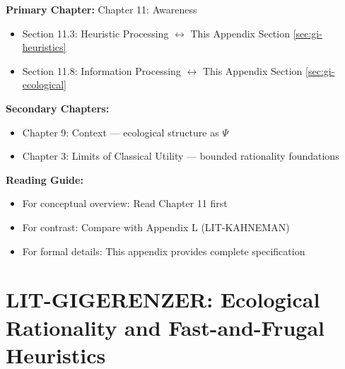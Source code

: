 \begin{tcolorbox}[colback=purple!5!white, colframe=purple!75!black,
    title=Chapter Linkage]

\textbf{Primary Chapter:} Chapter 11: Awareness
\begin{itemize}[nosep]
\item Section 11.3: Heuristic Processing $\leftrightarrow$ This Appendix Section \ref{sec:gi-heuristics}
\item Section 11.8: Information Processing $\leftrightarrow$ This Appendix Section \ref{sec:gi-ecological}
\end{itemize}

\textbf{Secondary Chapters:}
\begin{itemize}[nosep]
\item Chapter 9: Context --- ecological structure as $\Psi$
\item Chapter 3: Limits of Classical Utility --- bounded rationality foundations
\end{itemize}

\textbf{Reading Guide:}
\begin{itemize}[nosep]
\item For conceptual overview: Read Chapter 11 first
\item For contrast: Compare with Appendix L (LIT-KAHNEMAN)
\item For formal details: This appendix provides complete specification
\end{itemize}

\end{tcolorbox}


\chapter{LIT-GIGERENZER: Ecological Rationality and Fast-and-Frugal Heuristics}
\label{app:lit-gigerenzer}


\begin{abstract}
This appendix integrates Gerd Gigerenzer's research program into the EBF framework.
Gigerenzer's work establishes that: (1) simple heuristics can outperform complex
optimization in uncertain environments (less-is-more); (2) rationality should be
evaluated by fit between decision strategy and environment structure (ecological
rationality); (3) risk communication improves with natural frequencies over
probabilities. His contributions provide an alternative to the ``bias'' framing,
showing when heuristics are adaptive rather than erroneous. 19 papers spanning
1987-2011 are integrated, offering a complementary perspective to Kahneman-Tversky.
\end{abstract}


